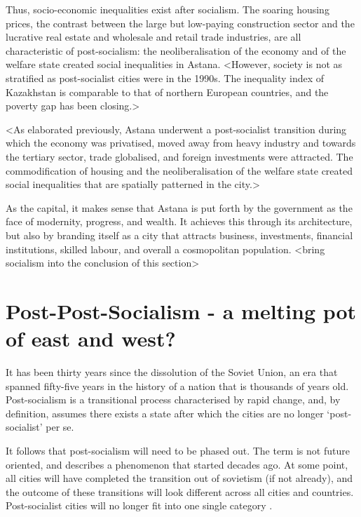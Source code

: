 \documentclass{article}
\begin{document}
Thus, socio-economic inequalities exist after socialism. The soaring housing prices, the contrast between the large but low-paying construction sector and the lucrative real estate and wholesale and retail trade industries, are all characteristic of post-socialism: the neoliberalisation of the economy and of the welfare state created social inequalities in Astana.
<However, society is not as stratified as post-socialist cities were in the 1990s. The inequality index of Kazakhstan is comparable to that of northern European countries, and the poverty gap has been closing.>

<As elaborated previously, Astana underwent a post-socialist transition during which the economy was privatised, moved away from heavy industry and towards the tertiary sector, trade globalised, and foreign investments were attracted. The commodification of housing and the neoliberalisation of the welfare state created social inequalities that are spatially patterned in the city.>

As the capital, it makes sense that Astana is put forth by the government as the face of modernity, progress, and wealth. It achieves this through its architecture, but also by branding itself as a city that attracts business, investments, financial institutions, skilled labour, and overall a cosmopolitan population.
<bring socialism into the conclusion of this section>

\section{Post-Post-Socialism - a melting pot of east and west?}


It has been thirty years since the dissolution of the Soviet Union, an era that spanned fifty-five years in the history of a nation that is thousands of years old. Post-socialism is a transitional process characterised by rapid change, and, by definition, assumes there exists a state after which the cities are no longer `post-socialist' per se.  

It follows that post-socialism will need to be phased out. The term is not future oriented, and describes a phenomenon that started decades ago. At some point, all cities will have completed the transition out of sovietism (if not already), and the outcome of these transitions will look different across all cities and countries. Post-socialist cities will no longer fit into one single category \parencite{hirt2016conceptual}.
\end{document}
